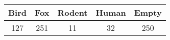 \scriptsize

\begin{tabular}{|c|c|c|c|c|} 
\hline
\textbf{Bird}& \textbf{Fox} & \textbf{Rodent} & \textbf{Human} & \textbf{Empty}\\
\hline
127 & 251 & 11 & 32 & 250 \\
\hline
\end{tabular}
